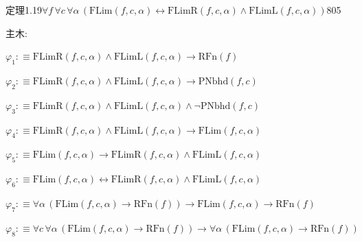 \begin{fullproof}{定理1.19}{$\forall f\,\forall c\,\forall \alpha\,(\mathrm{FLim}(f,c,\alpha) \leftrightarrow \mathrm{FLimR}(f,c,\alpha) \land \mathrm{FLimL}(f,c,\alpha))$}{805}
\begin{ptree}
\noLine
{}
\noLine
{}
\end{ptree}
\noindent 主木:
\begin{ptree}
\noLine
{}
\noLine
{}
\noLine
{}
\noLine
{}
\noLine
{}
\end{ptree}
\begin{abbrevlist}
\item $\varphi_{1} :\equiv \mathrm{FLimR}(f,c,\alpha) \land \mathrm{FLimL}(f,c,\alpha) \to \mathrm{RFn}(f)$
\item $\varphi_{2} :\equiv \mathrm{FLimR}(f,c,\alpha) \land \mathrm{FLimL}(f,c,\alpha) \to \mathrm{PNbhd}(f,c)$
\item $\varphi_{3} :\equiv \mathrm{FLimR}(f,c,\alpha) \land \mathrm{FLimL}(f,c,\alpha) \land \neg \mathrm{PNbhd}(f,c)$
\item $\varphi_{4} :\equiv \mathrm{FLimR}(f,c,\alpha) \land \mathrm{FLimL}(f,c,\alpha) \to \mathrm{FLim}(f,c,\alpha)$
\item $\varphi_{5} :\equiv \mathrm{FLim}(f,c,\alpha) \to \mathrm{FLimR}(f,c,\alpha) \land \mathrm{FLimL}(f,c,\alpha)$
\item $\varphi_{6} :\equiv \mathrm{FLim}(f,c,\alpha) \leftrightarrow \mathrm{FLimR}(f,c,\alpha) \land \mathrm{FLimL}(f,c,\alpha)$
\item $\varphi_{7} :\equiv \forall \alpha\,(\mathrm{FLim}(f,c,\alpha) \to \mathrm{RFn}(f)) \to \mathrm{FLim}(f,c,\alpha) \to \mathrm{RFn}(f)$
\item $\varphi_{8} :\equiv \forall c\,\forall \alpha\,(\mathrm{FLim}(f,c,\alpha) \to \mathrm{RFn}(f)) \to \forall \alpha\,(\mathrm{FLim}(f,c,\alpha) \to \mathrm{RFn}(f))$

\end{abbrevlist}
\end{fullproof}
